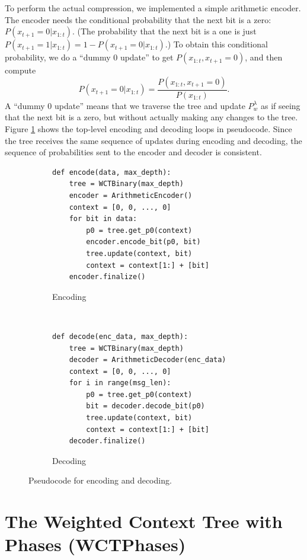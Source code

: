 \documentclass[11pt]{scrartcl}
\begin{document}
To perform the actual compression, we implemented a simple arithmetic encoder.
The encoder needs the conditional probability that the next bit is a zero:
$P(x_{t+1} = 0 | x_{1:t})$. (The probability that the next bit is a one is just
$P(x_{t+1} = 1 | x_{1:t}) = 1 - P(x_{t+1} = 0 | x_{1:t})$.)
To obtain this conditional probability, we do a
``dummy 0 update'' to get $P(x_{1:t}, x_{t+1} = 0)$, and then compute
\[
P(x_{t+1} = 0 | x_{1:t}) = \frac{ P(x_{1:t}, x_{t+1} = 0) }{ P(x_{1:t}) }.
\]
A ``dummy 0 update'' means that we traverse the tree and update $P_w^\lambda$
as if seeing that the next bit is a zero, but without actually making any
changes to the tree. Figure \ref{fig:enc-dec} shows the top-level encoding and
decoding loops in pseudocode. Since the tree receives the same sequence of
updates during encoding and decoding, the sequence of probabilities sent to the
encoder and decoder is consistent.

\begin{figure}[h!]
    \centering
    \begin{subfigure}[b]{0.5\textwidth}
\begin{verbatim}
def encode(data, max_depth):
    tree = WCTBinary(max_depth)
    encoder = ArithmeticEncoder()
    context = [0, 0, ..., 0]
    for bit in data:
        p0 = tree.get_p0(context)
        encoder.encode_bit(p0, bit)
        tree.update(context, bit)
        context = context[1:] + [bit]
    encoder.finalize() \end{verbatim}
        \caption{Encoding}
    \end{subfigure}
    ~
    \begin{subfigure}[b]{0.45\textwidth}
\begin{verbatim}
def decode(enc_data, max_depth):
    tree = WCTBinary(max_depth)
    decoder = ArithmeticDecoder(enc_data)
    context = [0, 0, ..., 0]
    for i in range(msg_len):
        p0 = tree.get_p0(context)
        bit = decoder.decode_bit(p0)
        tree.update(context, bit)
        context = context[1:] + [bit]
    decoder.finalize() \end{verbatim}
        \caption{Decoding}
    \end{subfigure}
    \caption{Pseudocode for encoding and decoding.}
    \label{fig:enc-dec}
\end{figure}


\section{The Weighted Context Tree with Phases (WCTPhases)}
\label{sec:wct-phases}
\end{document}
